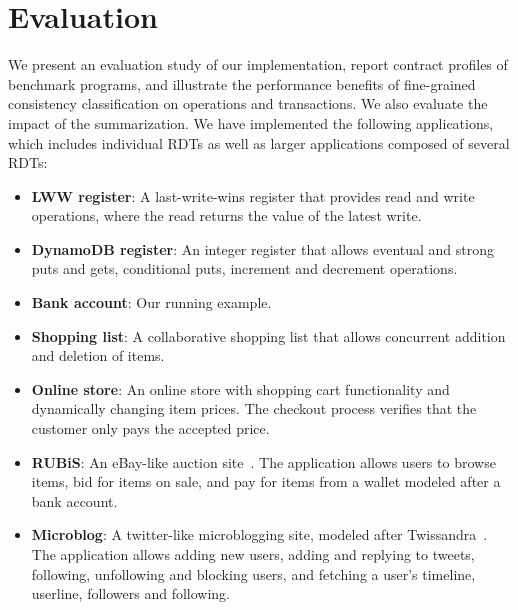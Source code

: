 \section{Evaluation}
\label{sec:results}

We present an evaluation study of our implementation, report contract
profiles of benchmark programs, and illustrate the performance benefits of
fine-grained consistency classification on operations and transactions. We
also evaluate the impact of the summarization. We have implemented the
following applications, which includes individual RDTs as well as larger
applications composed of several RDTs:

\begin{itemize}
\item \textbf{LWW register}: A last-write-wins register that provides read
	and write operations, where the read returns the value of the latest write.

\item \textbf{DynamoDB register}: An integer register that allows eventual
  and strong puts and gets, conditional puts, increment and decrement
  operations.

\item \textbf{Bank account}: Our running example.

\item \textbf{Shopping list}: A collaborative shopping list that allows
  concurrent addition and deletion of items.

\item \textbf{Online store}: An online store with shopping cart
  functionality and dynamically changing item prices.  The checkout process
  verifies that the customer only pays the accepted price.

\item \textbf{RUBiS}: An eBay-like auction site~\cite{RUBiS}. The
  application allows users to browse items, bid for items on sale, and pay
  for items from a wallet modeled after a bank account.

\item \textbf{Microblog}: A twitter-like microblogging site, modeled after
  Twissandra~\cite{Twissandra}. The application allows adding new users,
  adding and replying to tweets, following, unfollowing and blocking users,
  and fetching a user's timeline, userline, followers and following.
\end{itemize}

